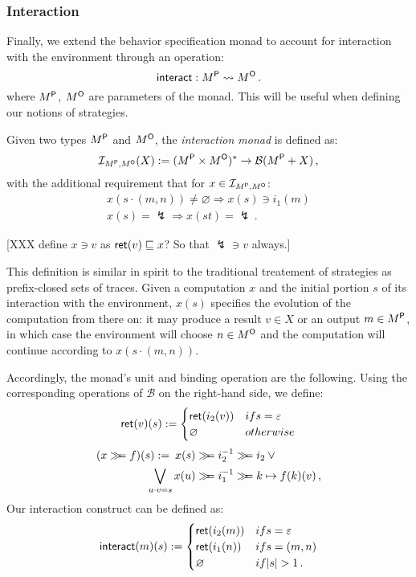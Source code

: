 \subsubsection{Interaction}

Finally, we extend the behavior specification monad
to account for interaction with the environment
through an operation:
\[
     \mathsf{interact}  : M^{ \mathsf{P} } \leadsto M^{ \mathsf{O} } \,.
\]
where $M^{ \mathsf{P} }$, $M^{ \mathsf{O} }$ are parameters of the monad.
This will be useful when defining our notions of strategies.

\begin{definition}
Given two types $M^{ \mathsf{P} }$ and $M^{ \mathsf{O} }$,
the \emph{interaction monad} is defined as:
\[
    \mathcal{I}_{M^{ \mathsf{P} }, M^{ \mathsf{O} }}(X) :=
      (M^{ \mathsf{P} } \times M^{ \mathsf{O} })^* \rightarrow \mathcal{B}(M^{ \mathsf{P} } + X) \,,
\]
with the additional requirement that
for $x \in \mathcal{I}_{M^{ \mathsf{P} }, M^{ \mathsf{O} }}$:
\begin{gather*}
  x(s \cdot (m, n)) \ne \varnothing \Rightarrow x(s) \ni i_1(m) \\
  x(s) = \lightning \Rightarrow x(st) = \lightning \,.
\end{gather*}
\end{definition}
[XXX define $x \ni v$ as $ \mathsf{ret} (v) \sqsubseteq x$?
So that $\lightning \ni v$ always.]

This definition is similar in spirit to
the traditional treatement of strategies as prefix-closed sets of traces.
Given a computation $x$ and
the initial portion $s$ of its interaction with the environment,
$x(s)$ specifies the evolution of the computation from there on:
it may produce a result $v \in X$
or an output $m \in M^{ \mathsf{P} }$,
in which case the environment will choose $n \in M^{ \mathsf{O} }$
and the computation will continue according to $x(s \cdot (m, n))$.

Accordingly,
the monad's unit and binding operation are the following.
Using the corresponding operations of $\mathcal{B}$
on the right-hand side, we define:
\[
     \mathsf{ret} (v)(s) :=
      \begin{cases}
         \mathsf{ret} (i_2(v)) & \relax{if } s = \varepsilon \\
        \varnothing  & \relax{otherwise}
      \end{cases}
\]
\begin{align*}
    (x \bind f)(s) := \:
      x(s) &\bind i_2^{-1} \bind i_2 \: \vee \\
      \bigvee_{u \cdot v = s} x(u) &\bind i_1^{-1} \bind k \mapsto f(k)(v) \,,
\end{align*}
Our interaction construct can be defined as:
\[
     \mathsf{interact} (m)(s) :=
      \begin{cases}
         \mathsf{ret} (i_2(m)) & \relax{if } s = \varepsilon \\
         \mathsf{ret} (i_1(n)) & \relax{if } s = (m, n) \\
        \varnothing & \relax{if } |s| > 1 \,.
      \end{cases}
\]

